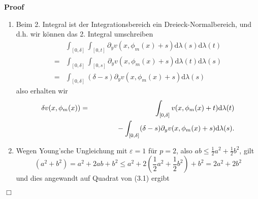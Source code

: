 \documentclass{book}
\newcommand{\mathd}{\mathrm{d}}
\newenvironment{enumeratealpha}{\begin{enumerate}[a{\textup{)}}] }{\end{enumerate}}
\newenvironment{proof}{\noindent\textbf{Proof\ }}{\hspace*{\fill}$\Box$\medskip}
\begin{document}
\begin{proof}
\begin{enumeratealpha}
    $\Gamma_m$ ist der Graph einer Funktion $\phi_m \in C^1 ([x_1, x_2])$
    sowie $\Omega^{\delta}_m \subseteq \Omega$ (siehe Anfang des Beweises).
    
    F{\"u}r $x \in [x_1, x_2]$ erhalten wir mittels Integraldarstellung
    \[ \forall t \in [0, s] : \text{\quad} v (x, \phi_m (x)) = v (x, \phi_m
       (x) + t) - \int_{[0, t]} \partial_y v (x, \phi_m (x) + s) \mathd
       \lambda (s) . \]
    {\hspace{1.7em}}Integration obiger Gleichung {\"u}ber $t$ von $0$ bis
    $\delta$ ergibt
    \begin{eqnarray*}
      \delta v (x, \phi_m (x)) & = & \int_{[0, \delta]} v (x, \phi_m (x) + t)
      \mathd \lambda (t)\\
      &  & \text{{\hspace{3em}}} - \int_{[0, \delta]} \int_{[0, t]}
      \partial_y v (x, \phi_m (x) + s) \mathd \lambda (s) \mathd \lambda (t) .
    \end{eqnarray*}
    \item Beim 2. Integral ist der Integrationsbereich ein
    Dreieck-Normalbereich, und d.h. wir k{\"o}nnen das 2. Integral umschreiben
    \
    \[ \begin{array}{ll}
         & \int_{[0, \delta]} \int_{[0, t]} \partial_y v (x, \phi_m (x) + s)
         \mathd \lambda (s) \mathd \lambda (t)\\
         = & \int_{[0, \delta]} \int_{[0, s]} \partial_y v (x, \phi_m (x) + s)
         \mathd \lambda (t) \mathd \lambda (s)\\
         = & \int_{[0, \delta]} (\delta - s) \partial_y v (x, \phi_m (x) + s)
         \mathd \lambda (s)
       \end{array} \]
    also erhalten wir
    \begin{eqnarray}
      \delta v (x, \phi_m (x)) & = & \int_{[0, \delta]} v (x, \phi_m (x) + t)
      \mathd \lambda (t) \nonumber\\
      &  & \text{{\hspace{3em}}} - \int_{[0, \delta]} (\delta - s) \partial_y
      v (x, \phi_m (x) + s) \mathd \lambda (s) . 
    \end{eqnarray}
    \item Wegen Young'sche Ungleichung mit $\varepsilon = 1$ f{\"u}r $p = 2$,
    also $a b \leqslant \frac{1}{2} a^2 + \frac{1}{2} b^2$, gilt
    \[ (a^2 + b^2) = a^2 + 2 a b + b^2 \leqslant a^2 + 2 \left( \frac{1}{2}
       a^2 + \frac{1}{2} b^2 \right) + b^2 = 2 a^2 + 2 b^2 \]
    und dies angewandt auf Quadrat von (3.1) ergibt

\end{enumeratealpha}
\end{proof}
\end{document}
